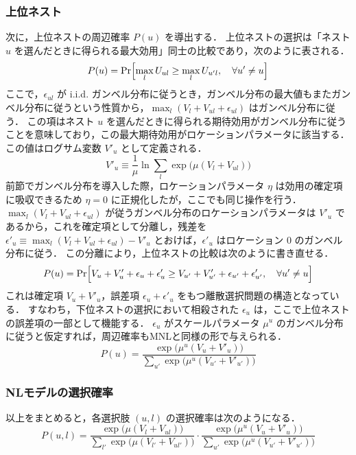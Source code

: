 \subsubsection{上位ネスト}
次に，上位ネストの周辺確率 $P(u)$ を導出する．
上位ネストの選択は「ネスト $u$ を選んだときに得られる最大効用」同士の比較であり，次のように表される．
\begin{equation}
  P(u) = \Pr\Bigl[\max_l U_{ul} \geq \max_l U_{u'l}, \quad \forall u' \neq u\Bigr]
\end{equation}
ここで，$\epsilon_{ul}$ が i.i.d. ガンベル分布に従うとき，ガンベル分布の最大値もまたガンベル分布に従うという性質から，$\max_l (V_l + V_{ul} + \epsilon_{ul})$ はガンベル分布に従う．
この項はネスト $u$ を選んだときに得られる期待効用がガンベル分布に従うことを意味しており，この最大期待効用がロケーションパラメータに該当する．
この値はログサム変数 $V'_u$ として定義される．
\begin{equation}\label{eq:nl-logsum}
  V'_u \equiv \frac{1}{\mu} \ln \sum_{l} \exp\bigl(\mu (V_l + V_{ul})\bigr)
\end{equation}
前節でガンベル分布を導入した際，ロケーションパラメータ $\eta$ は効用の確定項に吸収できるため $\eta = 0$ に正規化したが，ここでも同じ操作を行う．
$\max_l(V_l + V_{ul} + \epsilon_{ul})$ が従うガンベル分布のロケーションパラメータは $V'_u$ であるから，これを確定項として分離し，残差を $\epsilon'_u \equiv \max_l(V_l + V_{ul} + \epsilon_{ul}) - V'_u$ とおけば，$\epsilon'_u$ はロケーション $0$ のガンベル分布に従う．
この分離により，上位ネストの比較は次のように書き直せる．
\begin{equation}
  P(u) = \Pr\Bigl[V_u + V'_u + \epsilon_u + \epsilon'_u \geq V_{u'} + V'_{u'} + \epsilon_{u'} + \epsilon'_{u'}, \quad \forall u' \neq u\Bigr]
\end{equation}
これは確定項 $V_u + V'_u$，誤差項 $\epsilon_u + \epsilon'_u$ をもつ離散選択問題の構造となっている．
すなわち，下位ネストの選択において相殺された $\epsilon_u$ は，ここで上位ネストの誤差項の一部として機能する．
$\epsilon_u$ がスケールパラメータ $\mu^u$ のガンベル分布に従うと仮定すれば，周辺確率もMNLと同様の形で与えられる．
\begin{equation}\label{eq:nl-marginal}
  P(u) = \frac{\exp\bigl(\mu^u (V_u + V'_u)\bigr)}{\displaystyle\sum_{u'} \exp\bigl(\mu^u (V_{u'} + V'_{u'})\bigr)}
\end{equation}

\subsubsection{NLモデルの選択確率}
以上をまとめると，各選択肢 $(u,l)$ の選択確率は次のようになる．
\begin{equation}\label{eq:nl-joint}
  P(u,l) = \frac{\exp\bigl(\mu (V_l + V_{ul})\bigr)}{\displaystyle\sum_{l'} \exp\bigl(\mu (V_{l'} + V_{ul'})\bigr)} \cdot \frac{\exp\bigl(\mu^u (V_u + V'_u)\bigr)}{\displaystyle\sum_{u'} \exp\bigl(\mu^u (V_{u'} + V'_{u'})\bigr)}
\end{equation}

